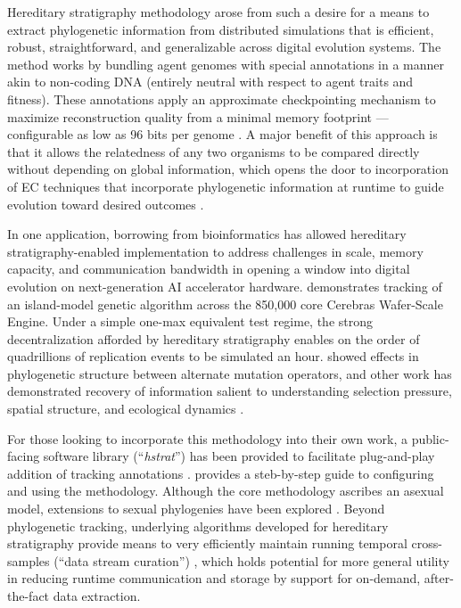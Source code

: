 Hereditary stratigraphy methodology arose from such a desire for a means to extract phylogenetic information from distributed simulations that is efficient, robust, straightforward, and generalizable across digital evolution systems.
The method works by bundling agent genomes with special annotations in a manner akin to non-coding DNA (entirely neutral with respect to agent traits and fitness).
These annotations apply an approximate checkpointing mechanism to maximize reconstruction quality from a minimal memory footprint --- configurable as low as 96 bits per genome \citep{moreno2022hereditary}.
A major benefit of this approach is that it allows the relatedness of any two organisms to be compared directly without depending on global information, which opens the door to incorporation of EC techniques that incorporate phylogenetic information at runtime to guide evolution toward desired outcomes \citep{lalejini2024phylogeny,lalejini2024runtime,murphy2008simple,burke2003increased}.

In one application, borrowing from bioinformatics has allowed hereditary stratigraphy-enabled implementation to address challenges in scale, memory capacity, and communication bandwidth in opening a window into digital evolution on next-generation AI accelerator hardware.
\citet{moreno2024trackable} demonstrates tracking of an island-model genetic algorithm across the 850,000 core Cerebras Wafer-Scale Engine.
Under a simple one-max equivalent test regime, the strong decentralization afforded by hereditary stratigraphy enables on the order of quadrillions of replication events to be simulated an hour.
\citet{moreno2024trackable} showed effects in phylogenetic structure between alternate mutation operators, and other work has demonstrated recovery of information salient to understanding selection pressure, spatial structure, and ecological dynamics \citep{moreno2024ecology}.

For those looking to incorporate this methodology into their own work, a public-facing software library (``\textit{hstrat}'') has been provided to facilitate plug-and-play addition of tracking annotations  \citep{moreno2022hstrat}.
\citet{moreno2024guide} provides a steb-by-step guide to configuring and using the methodology.
Although the core methodology ascribes an asexual model, extensions to sexual phylogenies have been explored \citep{moreno2024TODO}.
Beyond phylogenetic tracking, underlying algorithms developed for hereditary stratigraphy provide means to very efficiently maintain running temporal cross-samples (``data stream curation'') \citep{moreno2024efficient}, which holds potential for more general utility in reducing runtime communication and storage by support for on-demand, after-the-fact data extraction.
